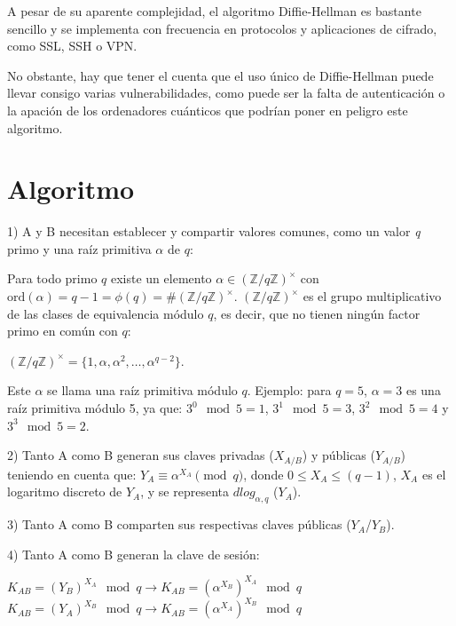 \documentclass[11pt]{article}
\begin{document}
A pesar de su aparente complejidad, el algoritmo Diffie-Hellman es bastante sencillo y se implementa con frecuencia en protocolos y aplicaciones de cifrado, como SSL, SSH o VPN.

No obstante, hay que tener el cuenta que el uso único de Diffie-Hellman puede llevar consigo varias vulnerabilidades, como puede ser la falta de autenticación o la apación de los ordenadores cuánticos que podrían poner en peligro este algoritmo.


\section{Algoritmo}
1) A y B necesitan establecer y compartir valores comunes, como un valor \textit{q} primo y una raíz primitiva $\alpha$  de $q$:

Para todo primo $q$ existe un elemento $\alpha \in (\mathbb{Z}/q\mathbb{Z})^{\times}$ con $\text{ord}(\alpha) = q - 1 = \phi(q) =  \# (\mathbb{Z}/q\mathbb{Z})^{\times}$.
$(\mathbb{Z}/q\mathbb{Z})^{\times}$ es el grupo multiplicativo de las clases de equivalencia módulo $q$, es decir, que no tienen ningún factor primo en común con $q$:
\begin{center}
$(\mathbb{Z}/q\mathbb{Z})^{\times} = \{1, \alpha, \alpha^2, \ldots, \alpha^{q-2}\}$.\\
\end{center}

Este $\alpha$ se llama una raíz primitiva módulo $q$. Ejemplo: para $q = 5$, $\alpha = 3$ es una raíz primitiva módulo 5, ya que:
$3^0 \mod 5 = 1$, $3^1 \mod 5 = 3$, $3^2 \mod 5 = 4$ y $3^3 \mod 5 = 2$.

\newpage

2) Tanto A como B generan sus claves privadas ($X_{A/B}$) y públicas ($Y_{A/B}$) teniendo en cuenta que:  $ Y_{A} \equiv \alpha^{X_A} \pmod{q}$, donde $0 \le X_A \le (q-1)$, $X_A$ es el logaritmo discreto de $Y_A$, y se representa $dlog_{\alpha,q}$ ($Y_A$).

3) Tanto A como B comparten sus respectivas claves públicas ($Y_A$/$Y_B$).

4) Tanto A como B generan la clave de sesión: 
\begin{center}
$K_{AB} = (Y_B)^{X_A} \mod q \rightarrow K_{AB} = (\alpha^{X_B})^{X_A} \mod q$  \\
$K_{AB} = (Y_A)^{X_B} \mod q \rightarrow K_{AB} = (\alpha^{X_A})^{X_B} \mod q$  \\
\end{center}
\end{document}
